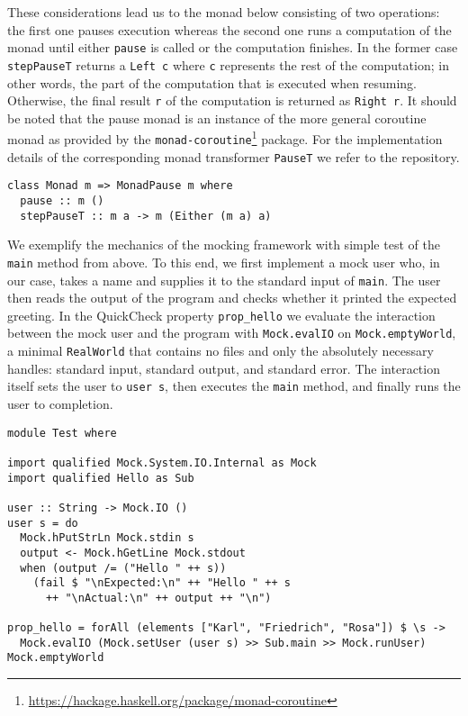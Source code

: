 These considerations lead us to the monad below consisting of two operations: the first one pauses execution whereas the second one runs a computation of the monad until either \texttt{pause} is called or the computation finishes.
In the former case \texttt{stepPauseT} returns a \texttt{Left c} where \texttt{c} represents the rest of the computation; in other words, the part of the computation that is executed when resuming. 
Otherwise, the final result \texttt{r} of the computation is returned as \texttt{Right r}.
It should be noted that the pause monad is an instance of the more general coroutine monad as provided by the \texttt{monad-coroutine}\footnote{\url{https://hackage.haskell.org/package/monad-coroutine}} package.
For the implementation details of the corresponding monad transformer \texttt{PauseT} we refer to the repository.
\begin{verbatim}
class Monad m => MonadPause m where
  pause :: m ()
  stepPauseT :: m a -> m (Either (m a) a)
\end{verbatim}
We exemplify the mechanics of the mocking framework with simple test of the \texttt{main} method from above.
To this end, we first implement a mock user who, in our case, takes a name and supplies it to the standard input of \texttt{main}.
The user then reads the output of the program and checks whether it printed the expected greeting.
In the QuickCheck property \texttt{prop_hello} we evaluate the interaction between the mock user and the program with \texttt{Mock.evalIO} on \texttt{Mock.emptyWorld}, a minimal \texttt{RealWorld} that contains no files and only the absolutely necessary handles: standard input, standard output, and standard error.
The interaction itself sets the user to \texttt{user s}, then executes the \texttt{main} method, and finally runs the user to completion.
\begin{verbatim}
module Test where

import qualified Mock.System.IO.Internal as Mock
import qualified Hello as Sub

user :: String -> Mock.IO ()
user s = do
  Mock.hPutStrLn Mock.stdin s
  output <- Mock.hGetLine Mock.stdout
  when (output /= ("Hello " ++ s))
    (fail $ "\nExpected:\n" ++ "Hello " ++ s
      ++ "\nActual:\n" ++ output ++ "\n")

prop_hello = forAll (elements ["Karl", "Friedrich", "Rosa"]) $ \s ->
  Mock.evalIO (Mock.setUser (user s) >> Sub.main >> Mock.runUser) Mock.emptyWorld
\end{verbatim}

